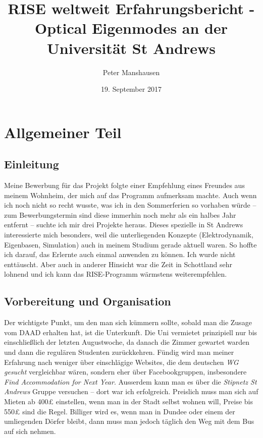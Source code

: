 \documentclass{article}
\begin{document}
\title{RISE weltweit Erfahrungsbericht - Optical Eigenmodes an der Universit{\"a}t St Andrews}
\author{ Peter Manshausen}
\date{19. September 2017}
\maketitle
\pagebreak
\renewcommand\contentsname{Inhalt}
\tableofcontents
\section{Allgemeiner Teil}
\subsection{Einleitung}
Meine Bewerbung f\"{u}r das Projekt folgte einer Empfehlung eines Freundes aus meinem Wohnheim, der mich auf das Programm aufmerksam machte. Auch wenn ich noch nicht so recht wusste, was ich in den Sommerferien so vorhaben w\"{u}rde -- zum Bewerbungstermin sind diese immerhin noch mehr als ein halbes Jahr entfernt -- suchte ich mir drei Projekte heraus. Dieses spezielle in St Andrews interessierte mich besonders, weil die unterliegenden Konzepte (Elektrodynamik, Eigenbasen, Simulation) auch in meinem Studium gerade aktuell waren. So hoffte ich darauf, das Erlernte auch einmal anwenden zu k\"{o}nnen. Ich wurde nicht entt\"{a}uscht. Aber auch in anderer Hinsicht war die Zeit in Schottland sehr lohnend und ich kann das RISE-Programm w\"{a}rmstens weiterempfehlen.
\subsection{Vorbereitung und Organisation}
Der wichtigste Punkt, um den man sich k{\"u}mmern sollte, sobald man die Zusage vom DAAD erhalten hat, ist die Unterkunft. Die Uni vermietet prinzipiell nur bis einschlie{\ss}lich der letzten Augustwoche, da danach die Zimmer gewartet warden und dann die regul{\"a}ren Studenten zur{\"u}ckkehren. F\"{u}ndig wird man meiner Erfahrung nach weniger \"{u}ber einschl{\"a}gige Websites, die dem deutschen \emph{WG gesucht} vergleichbar w{\"a}ren, sondern eher \"{u}ber Facebookgruppen, insbesondere \emph{Find Accommodation for Next Year}. Ausserdem kann man es \"{u}ber die \emph{Stipnetz St Andrews} Gruppe versuchen – dort war ich erfolgreich. Preislich muss man sich auf Mieten ab 400{\pounds} einstellen, wenn man in der Stadt selbst wohnen will, Preise bis 550{\pounds} sind die Regel. Billiger wird es, wenn man in Dundee oder einem der umliegenden D{\"o}rfer bleibt, dann muss man jedoch t{\"a}glich den Weg mit dem Bus auf sich nehmen.  
\end{document}
